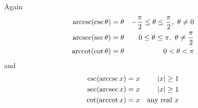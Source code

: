 Again
\begin{align*}
  \arccsc(\csc \theta) &= \theta & -\frac{\pi}{2} \leq \theta \leq \frac{\pi}{2},\ \theta\ne 0 \\
  \arcsec(\sec \theta) &= \theta & 0 \leq \theta \leq \pi,\ \theta\ne \frac{\pi}{2} \\
  \arccot(\cot \theta) &= \theta & 0 < \theta < \pi	
\end{align*}
and 
\begin{align*}
  \csc(\mathop{\mathrm{arccsc}} x) &= x & |x|\ge 1 \\
  \sec(\mathop{\mathrm{arcsec}} x) &= x & |x|\ge 1 \\
  \cot(\mathop{\mathrm{arccot}} x) &= x & \text{any real $x$}
\end{align*}













